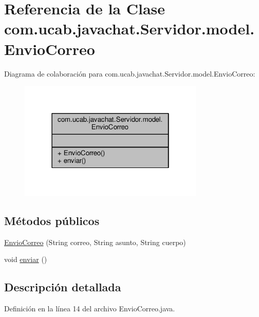 \hypertarget{classcom_1_1ucab_1_1javachat_1_1_servidor_1_1model_1_1_envio_correo}{\section{Referencia de la Clase com.\-ucab.\-javachat.\-Servidor.\-model.\-Envio\-Correo}
\label{classcom_1_1ucab_1_1javachat_1_1_servidor_1_1model_1_1_envio_correo}
}


Diagrama de colaboración para com.\-ucab.\-javachat.\-Servidor.\-model.\-Envio\-Correo\-:\nopagebreak
\begin{figure}[H]
\begin{center}
\leavevmode
\includegraphics[width=250pt]{classcom_1_1ucab_1_1javachat_1_1_servidor_1_1model_1_1_envio_correo__coll__graph}
\end{center}
\end{figure}
\subsection*{Métodos públicos}
\begin{DoxyCompactItemize}
\item 
\hyperlink{classcom_1_1ucab_1_1javachat_1_1_servidor_1_1model_1_1_envio_correo_aba6fd1242773c58ff4d3cd57162849d6}{Envio\-Correo} (String correo, String asunto, String cuerpo)
\item 
void \hyperlink{classcom_1_1ucab_1_1javachat_1_1_servidor_1_1model_1_1_envio_correo_a0698bb7315db4d54d94ca94d95226754}{enviar} ()
\end{DoxyCompactItemize}


\subsection{Descripción detallada}


Definición en la línea 14 del archivo Envio\-Correo.\-java.




